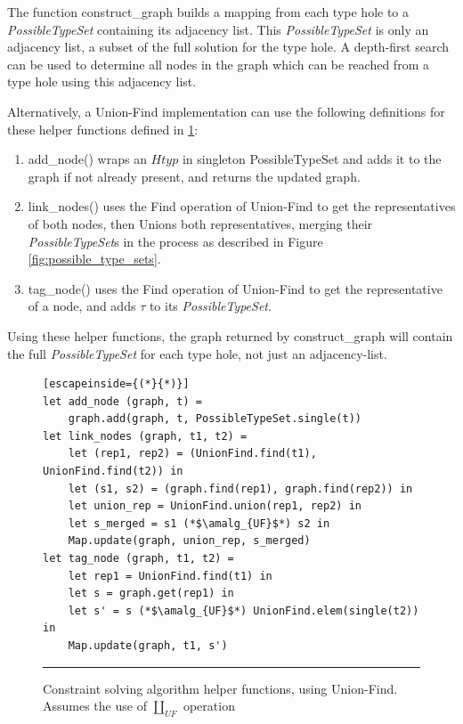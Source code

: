 The function construct\_graph builds a mapping from each type hole to a \emph{PossibleTypeSet} containing its adjacency list. This \textit{PossibleTypeSet} is only an adjacency list, a subset of the full solution for the type hole. A depth-first search can be used to determine all nodes in the graph which can be reached from a type hole using this adjacency list.

Alternatively, a Union-Find implementation can use the following definitions for these helper functions defined in \ref{fig:algcode_construct_graph_helpers}:
\begin{enumerate}
  \item add\_node() wraps an $Htyp$ in singleton PossibleTypeSet and adds it to the graph if not already present, and returns the updated graph.
  \item link\_nodes() uses the Find operation of Union-Find to get the representatives of both nodes, then Unions both representatives, merging their \textit{PossibleTypeSet}s in the process as described in Figure \ref{fig:possible_type_sets}.
  \item tag\_node() uses the Find operation of Union-Find to get the representative of a node, and adds $\tau$ to its \textit{PossibleTypeSet}.
\end{enumerate}
Using these helper functions, the graph returned by construct\_graph will contain the full \textit{PossibleTypeSet} for each type hole, not just an adjacency-list.

\begin{figure}[h!]
\begin{lstlisting}[escapeinside={(*}{*)}]
let add_node (graph, t) =
    graph.add(graph, t, PossibleTypeSet.single(t))
let link_nodes (graph, t1, t2) =
    let (rep1, rep2) = (UnionFind.find(t1), UnionFind.find(t2)) in
    let (s1, s2) = (graph.find(rep1), graph.find(rep2)) in
    let union_rep = UnionFind.union(rep1, rep2) in
    let s_merged = s1 (*$\amalg_{UF}$*) s2 in
    Map.update(graph, union_rep, s_merged)
let tag_node (graph, t1, t2) =
    let rep1 = UnionFind.find(t1) in
    let s = graph.get(rep1) in
    let s' = s (*$\amalg_{UF}$*) UnionFind.elem(single(t2)) in
    Map.update(graph, t1, s')
\end{lstlisting}
\vspace{-2px}
\hrule
\caption{Constraint solving algorithm helper functions, using Union-Find. Assumes the use of $\amalg_{UF}$ operation}
\label{fig:algcode_construct_graph_helpers}
\end{figure}

